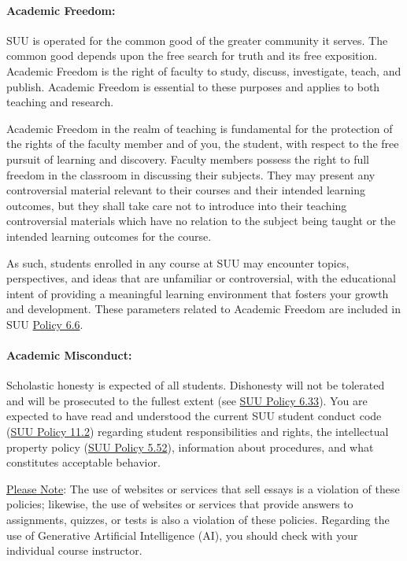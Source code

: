 \documentclass[12pt, letterpaper]{article}
\begin{document}
\paragraph{Academic Freedom:}
SUU is operated for the common good of the greater community it serves. The common good depends upon the free search for truth and its free exposition. Academic Freedom is the right of faculty to study, discuss, investigate, teach, and publish. Academic Freedom is essential to these purposes and applies to both teaching and research. 

\noindent
Academic Freedom in the realm of teaching is fundamental for the protection of the rights of the faculty member and of you, the student, with respect to the free pursuit of learning and discovery. Faculty members possess the right to full freedom in the classroom in discussing their subjects. They may present any controversial material relevant to their courses and their intended learning outcomes, but they shall take care not to introduce into their teaching controversial materials which have no relation to the subject being taught or the intended learning outcomes for the course.

\noindent
As such, students enrolled in any course at SUU may encounter topics, perspectives, and ideas that are unfamiliar or controversial, with the educational intent of providing a meaningful learning environment that fosters your growth and development. These parameters related to Academic Freedom are included in SUU \href{https://www.suu.edu/policies/06/06.html}{Policy 6.6}.

\paragraph{Academic Misconduct:}
Scholastic honesty is expected of all students. Dishonesty will not be tolerated and will be prosecuted to the fullest extent (see \href{https://www.suu.edu/policies/06/33.html}{SUU Policy 6.33}). You are expected to have read and understood the current SUU student conduct code (\href{https://www.suu.edu/policies/11/02.html}{SUU Policy 11.2}) regarding student responsibilities and rights, the intellectual property policy (\href{https://www.suu.edu/policies/05/52.html}{SUU Policy 5.52}), information about procedures, and what constitutes acceptable behavior. 

\noindent
\underline{Please Note}: The use of websites or services that sell essays is a violation of these policies; likewise, the use of websites or services that provide answers to assignments, quizzes, or tests is also a violation of these policies. Regarding the use of Generative Artificial Intelligence (AI), you should check with your individual course instructor.
\end{document}
